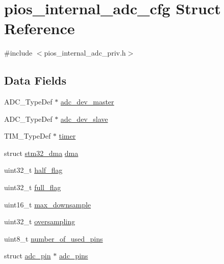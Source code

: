 \hypertarget{structpios__internal__adc__cfg}{\section{pios\-\_\-internal\-\_\-adc\-\_\-cfg \-Struct \-Reference}
\label{structpios__internal__adc__cfg}
}


{\ttfamily \#include $<$pios\-\_\-internal\-\_\-adc\-\_\-priv.\-h$>$}

\subsection*{\-Data \-Fields}
\begin{DoxyCompactItemize}
\item 
\-A\-D\-C\-\_\-\-Type\-Def $\ast$ \hyperlink{structpios__internal__adc__cfg_ac7b103c963e512c7104bbcd2b6dc3281}{adc\-\_\-dev\-\_\-master}
\item 
\-A\-D\-C\-\_\-\-Type\-Def $\ast$ \hyperlink{structpios__internal__adc__cfg_a78fcf970c586ff2dc5a5464b3eda21e6}{adc\-\_\-dev\-\_\-slave}
\item 
\-T\-I\-M\-\_\-\-Type\-Def $\ast$ \hyperlink{structpios__internal__adc__cfg_a4b3536fcdfcd39d13b1473995bf9fe03}{timer}
\item 
struct \hyperlink{structstm32__dma}{stm32\-\_\-dma} \hyperlink{structpios__internal__adc__cfg_a1c8ede53f98b8d8eee4d4144a4104427}{dma}
\item 
uint32\-\_\-t \hyperlink{structpios__internal__adc__cfg_ade026429ab4238f63092fa17b4f95e4e}{half\-\_\-flag}
\item 
uint32\-\_\-t \hyperlink{structpios__internal__adc__cfg_aaf65057cc3e9e3db9c075162b8ecfe1b}{full\-\_\-flag}
\item 
uint16\-\_\-t \hyperlink{structpios__internal__adc__cfg_ae647adbc83144e6f98ba7fb52ab72711}{max\-\_\-downsample}
\item 
uint32\-\_\-t \hyperlink{structpios__internal__adc__cfg_a1c08390ebe63500dd873bd5e6aeb1aa6}{oversampling}
\item 
uint8\-\_\-t \hyperlink{structpios__internal__adc__cfg_ad246cb549f9a270c69555a68f825212b}{number\-\_\-of\-\_\-used\-\_\-pins}
\item 
struct \hyperlink{structadc__pin}{adc\-\_\-pin} $\ast$ \hyperlink{structpios__internal__adc__cfg_aab81b632bc0f9deae3f430046125c883}{adc\-\_\-pins}
\end{DoxyCompactItemize}


